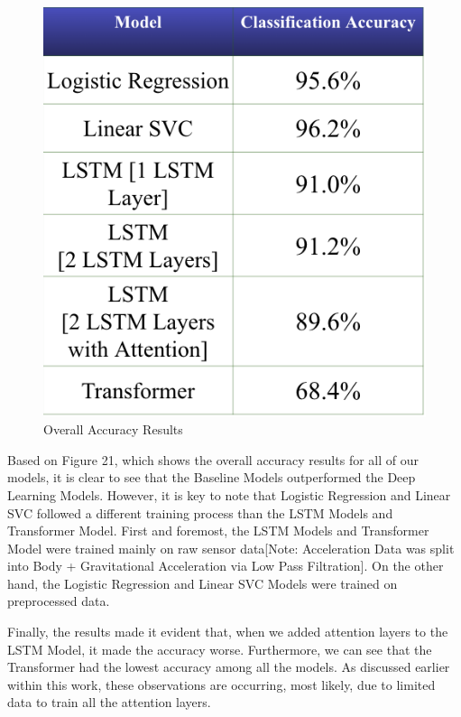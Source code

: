 \documentclass[conference]{IEEEtran}
\begin{document}
\begin{figure}[h!]
    \centering
    \includegraphics[width= 0.9 \linewidth]{results.png}
    \caption{Overall Accuracy Results}
    \label{results.png}
\end{figure}

Based on Figure 21, which shows the overall accuracy results for all of our models, it is clear to see that the Baseline Models outperformed the Deep Learning Models. However, it is key to note that Logistic Regression and Linear SVC followed a different training process than the LSTM Models and Transformer Model. First and foremost, the LSTM Models and Transformer Model were trained mainly on raw sensor data[Note: Acceleration Data was split into Body + Gravitational Acceleration via Low Pass Filtration]. On the other hand, the Logistic Regression and Linear SVC Models were trained on preprocessed data. \newline 

Finally, the results made it evident that, when we added attention layers to the LSTM Model, it made the accuracy worse. Furthermore, we can see that the Transformer had the lowest accuracy among all the models. As discussed earlier within this work, these observations are occurring, most likely, due to limited data to train all the attention layers.
\end{document}
